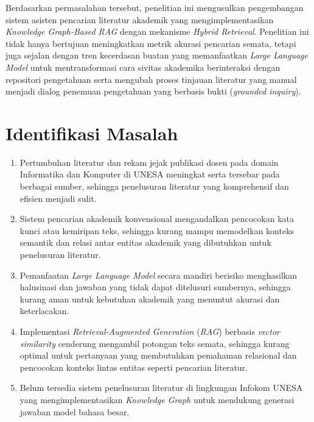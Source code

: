 Berdasarkan permasalahan tersebut, penelitian ini mengusulkan pengembangan sistem asisten pencarian literatur akademik yang mengimplementasikan \textit{Knowledge Graph-Based RAG} dengan mekanisme \textit{Hybrid Retrieval}. Penelitian ini tidak hanya bertujuan meningkatkan metrik akurasi pencarian semata, tetapi juga sejalan dengan tren kecerdasan buatan yang memanfaatkan \textit{Large Language Model} untuk mentransformasi cara sivitas akademika berinteraksi dengan repositori pengetahuan serta mengubah proses tinjauan literatur yang manual menjadi dialog penemuan pengetahuan yang berbasis bukti (\textit{grounded inquiry}).

\section{Identifikasi Masalah}

\begin{enumerate}[label=\arabic*., leftmargin=0.75cm]
    \item Pertumbuhan literatur dan rekam jejak publikasi dosen pada domain Informatika dan Komputer di UNESA meningkat serta tersebar pada berbagai sumber, sehingga penelusuran literatur yang komprehensif dan efisien menjadi sulit.

    \item Sistem pencarian akademik konvensional mengandalkan pencocokan kata kunci atau kemiripan teks, sehingga kurang mampu memodelkan konteks semantik dan relasi antar entitas akademik yang dibutuhkan untuk penelusuran literatur.

    \item Pemanfaatan \textit{Large Language Model} secara mandiri berisiko menghasilkan halusinasi dan jawaban yang tidak dapat ditelusuri sumbernya, sehingga kurang aman untuk kebutuhan akademik yang menuntut akurasi dan keterlacakan.

    \item Implementasi \textit{Retrieval-Augmented Generation} (\textit{RAG}) berbasis \textit{vector similarity} cenderung mengambil potongan teks semata, sehingga kurang optimal untuk pertanyaan yang membutuhkan pemahaman relasional dan pencocokan konteks lintas entitas seperti pencarian literatur.

    \item Belum tersedia sistem penelusuran literatur di lingkungan Infokom UNESA yang mengimplementasikan \textit{Knowledge Graph} untuk mendukung generasi jawaban model bahasa besar.
\end{enumerate}

